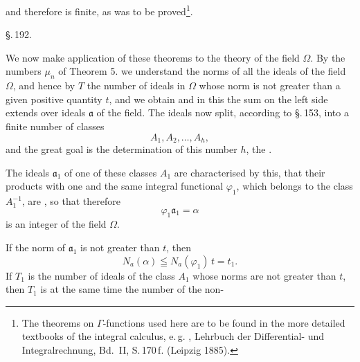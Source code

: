 and therefore
is finite, as was to be proved\footnote{The theorems on $\Gamma$-functions used here are to be found in the more detailed textbooks of the integral calculus, e.\,g. , Lehrbuch der Differential- und Integralrechnung, Bd.\ II, S.\,170\,f. (Leipzig 1885).}.

\begin{center}
\S.\,192.\\[4pt]
\end{center}

We now make application of these theorems to the theory of the field $\Omega$. By the numbers $\mu_n$ of Theorem 5. we understand the norms of all the ideals of the field $\Omega$, and hence by $T$ the number of ideals in $\Omega$ whose norm is not greater than a given positive quantity $t$, and we obtain
and in this the sum on the left side extends over  ideals $\mathfrak{a}$ of the field. The ideals now split, according to \S.\,153, into a finite number of classes
\[
A_1, A_2, \ldots, A_h,
\]
and the great goal is the determination of this number $h$, the .

The ideals $\mathfrak{a}_1$ of one of these classes $A_1$ are characterised by this, that their products with one and the same integral functional $\varphi_1$, which belongs to the class $A_1^{-1}$, are , so that therefore
\[
\varphi_1 \mathfrak{a}_1 = \alpha
\]
is an integer of the field $\Omega$.

If the norm of $\mathfrak{a}_1$ is not greater than $t$, then
\[
N_a(\alpha) \leqq N_a(\varphi_1)\, t = t_1.
\]
If $T_1$ is the number of ideals of the class $A_1$ whose norms are not greater than $t$, then $T_1$ is at the same time the number of the non-
